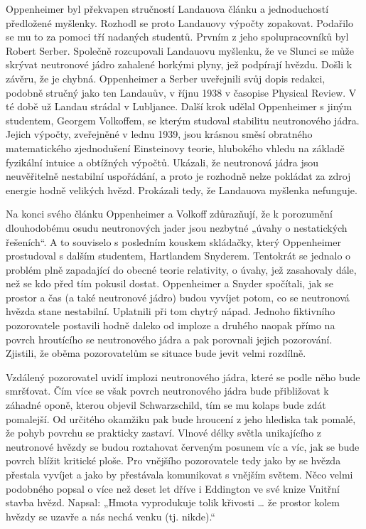   Oppenheimer byl překvapen stručností Landauova článku a jednoduchostí předložené myšlenky. Rozhodl
  se proto Landauovy výpočty zopakovat. Podařilo se mu to za pomoci tří nadaných studentů. Prvním z
  jeho spolupracovníků byl Robert Serber. Společně rozcupovali Landauovu myšlenku, že ve Slunci se
  může skrývat neutronové jádro zahalené horkými plyny, jež podpírají hvězdu. Došli k závěru, že je
  chybná. Oppenheimer a Serber uveřejnili svůj dopis redakci, podobně stručný jako ten Landauův, v
  říjnu 1938 v časopise Physical Review. V té době už Landau strádal v Lubljance. Další krok udělal
  Oppenheimer s jiným studentem, Georgem Volkoffem, se kterým studoval stabilitu neutronového jádra.
  Jejich výpočty, zveřejněné v lednu 1939, jsou krásnou směsí obratného matematického zjednodušení
  Einsteinovy teorie, hlubokého vhledu na základě fyzikální intuice a obtížných výpočtů. Ukázali, že
  neutronová jádra jsou neuvěřitelně nestabilní uspořádání, a proto je rozhodně nelze pokládat za
  zdroj energie hodně velikých hvězd. Prokázali tedy, že Landauova myšlenka nefunguje. 
  
  Na konci svého článku Oppenheimer a Volkoff zdůrazňují, že k porozumění dlouhodobému osudu
  neutronových jader jsou nezbytné „úvahy o nestatických řešeních“. A to souviselo s posledním
  kouskem skládačky, který Oppenheimer prostudoval s dalším studentem, Hartlandem Snyderem.
  Tentokrát se jednalo o problém plně zapadající do obecné teorie relativity, o úvahy, jež
  zasahovaly dále, než se kdo před tím pokusil dostat. Oppenheimer a Snyder spočítali, jak se
  prostor a čas (a také neutronové jádro) budou vyvíjet potom, co se neutronová hvězda stane
  nestabilní. Uplatnili při tom chytrý nápad. Jednoho fiktivního pozorovatele postavili hodně daleko
  od imploze a druhého naopak přímo na povrch hroutícího se neutronového jádra a pak porovnali
  jejich pozorování. Zjistili, že oběma pozorovatelům se situace bude jevit velmi rozdílně. 
  
  Vzdálený pozorovatel uvidí implozi neutronového jádra, které se podle něho bude smršťovat. Čím
  více se však povrch neutronového jádra bude přibližovat k záhadné oponě, kterou objevil
  Schwarzschild, tím se mu kolaps bude zdát pomalejší. Od určitého okamžiku pak bude hroucení z jeho
  hlediska tak pomalé, že pohyb povrchu se prakticky zastaví. Vlnové délky světla unikajícího z
  neutronové hvězdy se budou roztahovat červeným posunem víc a víc, jak se bude povrch blížit
  kritické ploše. Pro vnějšího pozorovatele tedy jako by se hvězda přestala vyvíjet a jako by
  přestávala komunikovat s vnějším světem. Něco velmi podobného popsal o více než deset let dříve i
  Eddington ve své knize Vnitřní stavba hvězd. Napsal: „Hmota vyprodukuje tolik křivosti … že
  prostor kolem hvězdy se uzavře a nás nechá venku (tj. nikde).“
  
